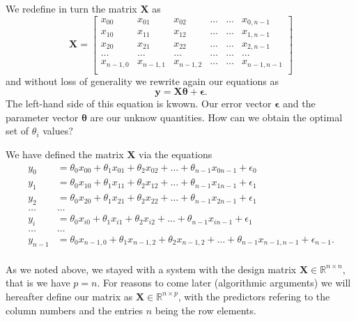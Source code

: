 \documentclass[%
oneside,                 %
final,                   %
10pt]{article}
\newenvironment{block_mdfboxadmon}[1][]{
\begin{block_mdfboxmdframed}[frametitle=#1]
}
{
\end{block_mdfboxmdframed}
}
\begin{document}

\begin{block_mdfboxadmon}[]
We redefine in turn the matrix $\bm{X}$ as
\[
\bm{X}=
\begin{bmatrix} 
x_{00}& x_{01} &x_{02}& \dots & \dots &x_{0,n-1}\\
x_{10}& x_{11} &x_{12}& \dots & \dots &x_{1,n-1}\\
x_{20}& x_{21} &x_{22}& \dots & \dots &x_{2,n-1}\\                      
\dots& \dots &\dots& \dots & \dots &\dots\\
x_{n-1,0}& x_{n-1,1} &x_{n-1,2}& \dots & \dots &x_{n-1,n-1}\\
\end{bmatrix} 
\]
and without loss of generality we rewrite again  our equations as
\[
\bm{y} = \bm{X}\bm{\theta}+\bm{\epsilon}.
\]
The left-hand side of this equation is kwown. Our error vector $\bm{\epsilon}$ and the parameter vector $\bm{\theta}$ are our unknow quantities. How can we obtain the optimal set of $\theta_i$ values?
\end{block_mdfboxadmon} %





\begin{block_mdfboxadmon}[]
We have defined the matrix $\bm{X}$ via the equations
\begin{align*}
y_0&=\theta_0x_{00}+\theta_1x_{01}+\theta_2x_{02}+\dots+\theta_{n-1}x_{0n-1}+\epsilon_0\\
y_1&=\theta_0x_{10}+\theta_1x_{11}+\theta_2x_{12}+\dots+\theta_{n-1}x_{1n-1}+\epsilon_1\\
y_2&=\theta_0x_{20}+\theta_1x_{21}+\theta_2x_{22}+\dots+\theta_{n-1}x_{2n-1}+\epsilon_1\\
\dots & \dots \\
y_{i}&=\theta_0x_{i0}+\theta_1x_{i1}+\theta_2x_{i2}+\dots+\theta_{n-1}x_{in-1}+\epsilon_1\\
\dots & \dots \\
y_{n-1}&=\theta_0x_{n-1,0}+\theta_1x_{n-1,2}+\theta_2x_{n-1,2}+\dots+\theta_{n-1}x_{n-1,n-1}+\epsilon_{n-1}.\\
\end{align*}

As we noted above, we stayed with a system with the design matrix 
 $\bm{X}\in {\mathbb{R}}^{n\times n}$, that is we have $p=n$. For reasons to come later (algorithmic arguments) we will hereafter define 
our matrix as $\bm{X}\in {\mathbb{R}}^{n\times p}$, with the predictors refering to the column numbers and the entries $n$ being the row elements.
\end{block_mdfboxadmon} %
\end{document}
